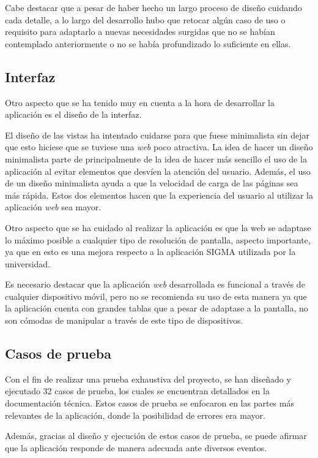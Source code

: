 Cabe destacar que a pesar de haber hecho un largo proceso de diseño cuidando cada detalle, a lo largo del desarrollo hubo que retocar algún caso de uso o requisito para adaptarlo a nuevas necesidades surgidas que no se habían contemplado anteriormente o no se había profundizado lo suficiente en ellas.

\subsection{Interfaz}
Otro aspecto que se ha tenido muy en cuenta a la hora de desarrollar la aplicación es el diseño de la interfaz.

El diseño de las vistas ha intentado cuidarse para que fuese minimalista sin dejar que esto hiciese que se tuviese una \textit{web} poco atractiva.
La idea de hacer un diseño minimalista parte de principalmente de la idea de hacer más sencillo el uso de la aplicación al evitar elementos que desvíen la atención del usuario.
Además, el uso de un diseño minimalista ayuda a que la velocidad de carga de las páginas sea más rápida.
Estos dos elementos hacen que la experiencia del usuario al utilizar la aplicación \textit{web} sea mayor.

Otro aspecto que se ha cuidado al realizar la aplicación es que la web se adaptase lo máximo posible a cualquier tipo de resolución de pantalla, aspecto importante, ya que en esto es una mejora respecto a la aplicación SIGMA utilizada por la universidad.

Es necesario destacar que la aplicación \textit{web} desarrollada es funcional a través de cualquier dispositivo móvil, pero no se recomienda su uso de esta manera ya que la aplicación cuenta con grandes tablas que a pesar de adaptase a la pantalla, no son cómodas de manipular a través de este tipo de dispositivos.

\subsection{Casos de prueba}
Con el fin de realizar una prueba exhaustiva del proyecto, se han diseñado y ejecutado 32 casos de prueba, los cuales se encuentran detallados en la documentación técnica. Estos casos de prueba se enfocaron en las partes más relevantes de la aplicación, donde la posibilidad de errores era mayor.

Además, gracias al diseño y ejecución de estos casos de prueba, se puede afirmar que la aplicación responde de manera adecuada ante diversos eventos.

